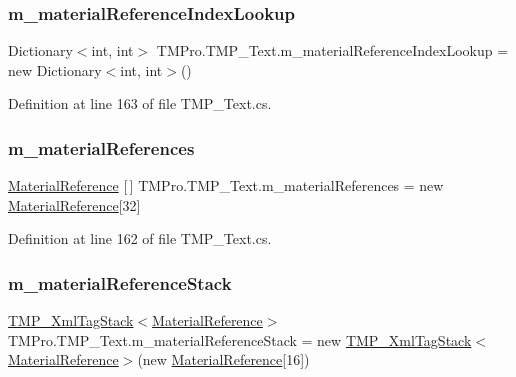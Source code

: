 \subsubsection{\texorpdfstring{m\_materialReferenceIndexLookup}{m\_materialReferenceIndexLookup}}
{\footnotesize\ttfamily Dictionary$<$int, int$>$ T\+M\+Pro.\+T\+M\+P\+\_\+\+Text.\+m\+\_\+material\+Reference\+Index\+Lookup = new Dictionary$<$int, int$>$()\hspace{0.3cm}{\ttfamily [protected]}}



Definition at line 163 of file T\+M\+P\+\_\+\+Text.\+cs.

\mbox{\label{class_t_m_pro_1_1_t_m_p___text_a940c7e3cd3ee953b9aecd62f9664bbfa}} 
\subsubsection{\texorpdfstring{m\_materialReferences}{m\_materialReferences}}
{\footnotesize\ttfamily \mbox{\hyperlink{struct_t_m_pro_1_1_material_reference}{Material\+Reference}} \mbox{[}$\,$\mbox{]} T\+M\+Pro.\+T\+M\+P\+\_\+\+Text.\+m\+\_\+material\+References = new \mbox{\hyperlink{struct_t_m_pro_1_1_material_reference}{Material\+Reference}}\mbox{[}32\mbox{]}\hspace{0.3cm}{\ttfamily [protected]}}



Definition at line 162 of file T\+M\+P\+\_\+\+Text.\+cs.

\mbox{\label{class_t_m_pro_1_1_t_m_p___text_a2c7717e0df2a91a3ad89aec69672a6bf}} 
\subsubsection{\texorpdfstring{m\_materialReferenceStack}{m\_materialReferenceStack}}
{\footnotesize\ttfamily \mbox{\hyperlink{struct_t_m_pro_1_1_t_m_p___xml_tag_stack}{T\+M\+P\+\_\+\+Xml\+Tag\+Stack}}$<$\mbox{\hyperlink{struct_t_m_pro_1_1_material_reference}{Material\+Reference}}$>$ T\+M\+Pro.\+T\+M\+P\+\_\+\+Text.\+m\+\_\+material\+Reference\+Stack = new \mbox{\hyperlink{struct_t_m_pro_1_1_t_m_p___xml_tag_stack}{T\+M\+P\+\_\+\+Xml\+Tag\+Stack}}$<$\mbox{\hyperlink{struct_t_m_pro_1_1_material_reference}{Material\+Reference}}$>$(new \mbox{\hyperlink{struct_t_m_pro_1_1_material_reference}{Material\+Reference}}\mbox{[}16\mbox{]})\hspace{0.3cm}{\ttfamily [protected]}}



